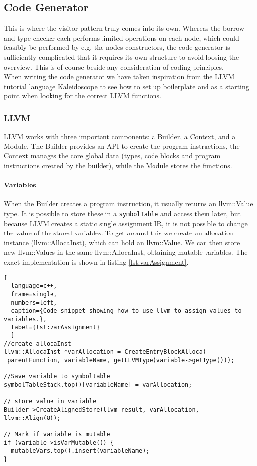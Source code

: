\subsection{Code Generator}
\label{sec:CodeGenImplement}
This is where the visitor pattern truly comes into its own. Whereas the borrow and type checker each performs limited operations on each node, which could feasibly be performed by e.g. the nodes constructors, the code generator is sufficiently complicated that it requires its own structure to avoid loosing the overview. This is of course beside any consideration of coding principles.\\
When writing the code generator we have taken inspiration from the LLVM tutorial
language Kaleidoscope\cite{LLVMTutorial} to see how to set up boilerplate and as a
starting point when looking for the correct LLVM functions.

\subsubsection{LLVM}
LLVM works with three important components: a Builder, a Context, and a Module. The Builder provides an API to create the program instructions, the Context manages the core global data (types, code blocks and program instructions created by the builder), while the Module stores the functions.

\paragraph*{Variables}
When the Builder creates a program instruction, it usually returns an llvm::Value type. It is possible to store these in a \texttt{symbolTable} and access them later, but because LLVM creates a static single assignment IR, it is not possible to change the value of the stored variables. To get around this we create an allocation instance (llvm::AllocaInst), which can hold an llvm::Value. We can then store new llvm::Values in the same llvm::AllocaInst, obtaining mutable variables. The exact implementation is shown in listing \ref{lst:varAssignment}.

\begin{lstlisting}[
  language=c++,
  frame=single,
  numbers=left,
  caption={Code snippet showing how to use llvm to assign values to variables.},
  label={lst:varAssignment}
  ]
//create allocaInst
llvm::AllocaInst *varAllocation = CreateEntryBlockAlloca(
 parentFunction, variableName, getLLVMType(variable->getType()));
  	
//Save variable to symboltable
symbolTableStack.top()[variableName] = varAllocation;

// store value in variable
Builder->CreateAlignedStore(llvm_result, varAllocation, llvm::Align(8));

// Mark if variable is mutable
if (variable->isVarMutable()) {
  mutableVars.top().insert(variableName);
}
\end{lstlisting}

